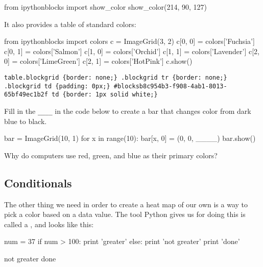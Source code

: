 \documentclass{book}
\begin{document}
\begin{VerbIn}
from ipythonblocks import show_color
show_color(214, 90, 127)
\end{VerbIn}


It also provides a table of standard colors:

\begin{VerbIn}
from ipythonblocks import colors
c = ImageGrid(3, 2)
c[0, 0] = colors['Fuchsia']
c[0, 1] = colors['Salmon']
c[1, 0] = colors['Orchid']
c[1, 1] = colors['Lavender']
c[2, 0] = colors['LimeGreen']
c[2, 1] = colors['HotPink']
c.show()
\end{VerbIn}

\begin{Verbatim}
table.blockgrid {border: none;} .blockgrid tr {border: none;} .blockgrid td {padding: 0px;} #blocksb8c954b3-f908-4ab1-8013-65bf49ec1b2f td {border: 1px solid white;}
\end{Verbatim}

\begin{challenge}
  Fill in the \texttt{\_\_\_\_} in the code below to create a bar that
  changes color from dark blue to black.

\begin{VerbIn}
bar = ImageGrid(10, 1)
for x in range(10):
    bar[x, 0] = (0, 0, ____)
bar.show()
\end{VerbIn}
\end{challenge}

\begin{challenge}
  Why do computers use red, green, and blue as their primary colors?
\end{challenge}

\subsection{Conditionals}

The other thing we need in order to create a heat map of our own is a
way to pick a color based on a data value. The tool Python gives us for
doing this is called a , and looks like this:

\begin{VerbIn}
num = 37
if num > 100:
    print 'greater'
else:
    print 'not greater'
print 'done'
\end{VerbIn}

\begin{VerbOut}
not greater
done
\end{VerbOut}
\end{document}

